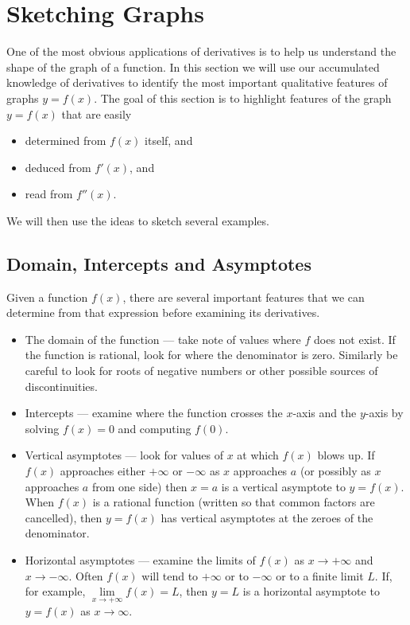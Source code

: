 \section{Sketching Graphs}\label{sec curve sketch}
One of the most obvious applications of derivatives is to help us understand the shape of
the graph of a function. In this section we will use our accumulated knowledge of
derivatives to identify the most important qualitative features of graphs $y=f(x)$. The
goal of this section is to highlight features of the graph $y=f(x)$ that are easily
\begin{itemize}
\item determined from $f(x)$ itself, and

\item deduced from $f'(x)$, and

\item read from $f''(x)$.
\end{itemize}
We will then use the ideas to sketch several examples.
\subsection{Domain, Intercepts and Asymptotes}
Given a function $f(x)$, there are several important features that we can determine from
that expression before examining its derivatives.

\begin{itemize}
 \item The domain of the function --- take note of values where $f$ does not exist. If
the function is rational, look for where the denominator is zero. Similarly be careful
to look for roots of negative numbers or other possible sources of discontinuities.

\item Intercepts --- examine where the function crosses the $x$-axis and the $y$-axis
by solving $f(x)=0$ and computing $f(0)$.

\item Vertical asymptotes --- look for values of $x$ at which $f(x)$ blows up. If $f(x)$
approaches either $+\infty$ or $-\infty$ as $x$ approaches $a$ (or possibly as $x$
approaches $a$ from one side) then $x=a$ is a vertical asymptote to $y=f(x)$. When $f(x)$
is a rational function (written so that common factors are cancelled), then $y=f(x)$ has
vertical asymptotes at the zeroes of the denominator.

\item Horizontal asymptotes --- examine the limits of $f(x)$ as $x\to+\infty$ and
$x\to-\infty$. Often $f(x)$ will tend to $+\infty$ or to $-\infty$ or to a finite limit
$L$. If, for example, $\lim\limits_{x\rightarrow+\infty}f(x)=L$, then $y=L$
is a horizontal asymptote to $y=f(x)$ as $x\rightarrow\infty$.
\end{itemize}

